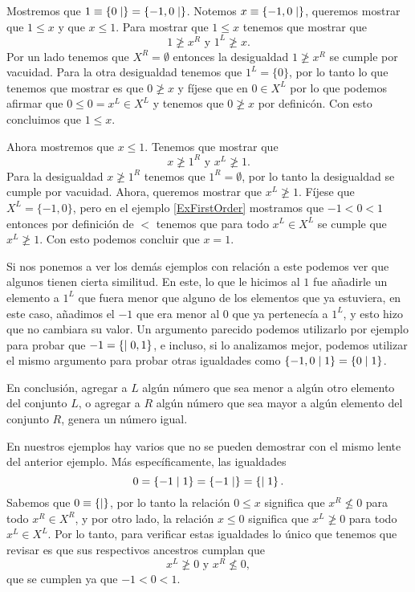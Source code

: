     \begin{example} \label{ExErasePar}
        Mostremos que $1\equiv \left\{0\mid \right\} = \left\{-1, 0\mid \right\}$. Notemos $x\equiv \left\{-1, 0\mid \right\}$, queremos mostrar que $1 \le x$ y que $x \le 1$. Para mostrar que $1\le x$ tenemos que mostrar que
        \[
            1 \not\ge x^R \text{ y } 1^L \not\ge x.
        \]
        Por un lado tenemos que $X^R = \emptyset$ entonces la desigualdad $1 \not\ge x^R$ se cumple por vacuidad. Para la otra desigualdad tenemos que $1^L=\{0\}$, por lo tanto lo que tenemos que mostrar es que $0 \not\ge x$ y f\'ijese que en $0\in X^L$ por lo que podemos afirmar que $0\le 0 = x^L\in X^L$ y tenemos que $0 \not\ge x$ por definic\'on. Con esto concluimos que $1\le x$.

        Ahora mostremos que $x\le 1$. Tenemos que mostrar que
        \[
            x \not\ge 1^R \text{ y } x^L \not\ge 1.
        \]
        Para la desigualdad $x \not\ge 1^R$ tenemos que $1^R = \emptyset$, por lo tanto la desigualdad se cumple por vacuidad. Ahora, queremos mostrar que $x^L \not\ge 1$. F\'ijese que $X^L = \{-1, 0\}$, pero en el ejemplo \ref{ExFirstOrder} mostramos que $-1 < 0 < 1$ entonces por definici\'on de $<$ tenemos que para todo $x^L\in X^L$ se cumple que $x^L \not\ge 1$. Con esto podemos concluir que $x = 1$.
        
        Si nos ponemos a ver los dem\'as ejemplos con relaci\'on a este podemos ver que algunos tienen cierta similitud. En este, lo que le hicimos al $1$ fue añadirle un elemento a $1^L$ que fuera menor que alguno de los elementos que ya estuviera, en este caso, añadimos el $-1$ que era menor al $0$ que ya pertenec\'ia a $1^L$, y esto hizo que no cambiara su valor. Un argumento parecido podemos utilizarlo por ejemplo para probar que $-1 = \left\{\mid 0,1\right\}$, e incluso, si lo analizamos mejor, podemos utilizar el mismo argumento para probar otras igualdades como $\left\{-1,0\mid 1\right\} = \left\{0\mid 1\right\}$.

        En conclusi\'on, agregar a $L$ alg\'un n\'umero que sea menor a alg\'un otro elemento del conjunto $L$, o agregar a $R$ alg\'un n\'umero que sea mayor a alg\'un elemento del conjunto $R$, genera un n\'umero igual.
    \end{example}

    \begin{example}
        En nuestros ejemplos hay varios que no se pueden demostrar con el mismo lente del anterior ejemplo. M\'as espec\'ificamente, las igualdades
        \[
            0 = \left\{-1\mid 1\right\} = \left\{-1\mid \right\} = \left\{\mid 1\right\}.
        \]
        Sabemos que $0 \equiv \left\{\mid \right\}$, por lo tanto la relaci\'on $0 \le x$ significa que $x^R \not\le 0$ para todo $x^R\in X^R$, y por otro lado, la relaci\'on $x\le 0$ significa que $x^L \not\ge 0$ para todo $x^L\in X^L$. Por lo tanto, para verificar estas igualdades lo \'unico que tenemos que revisar es que sus respectivos ancestros cumplan que
        \[
            x^L \not\ge 0\text{ y } x^R \not\le 0,
        \]
        que se cumplen ya que $-1 < 0 < 1$. 
    \end{example}

